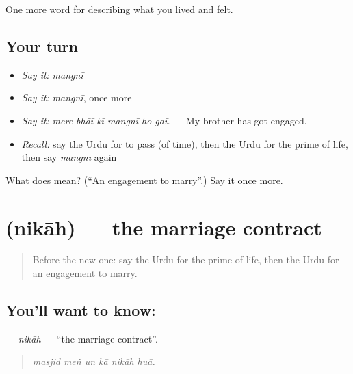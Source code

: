 \begin{grammarlens}[title={What you've built}]
One more word for describing what you lived and felt.
\end{grammarlens}

\subsection*{Your turn}
\begin{itemize}
\raggedright
  \item \emph{Say it:} \emph{mangnī}
  \item \emph{Say it:} \emph{mangnī}, once more
  \item \emph{Say it:} \emph{mere bhāī kī mangnī ho gaī.} — My brother has got engaged.
  \item \emph{Recall:} say the Urdu for to pass (of time), then the Urdu for the prime of life, then say \emph{mangnī} again
\end{itemize}

\begin{tcolorbox}[breakable,colback=teal!4,colframe=teal!35!black,title={Before you move on}]
What does  mean? (\textquotedblleft{}An engagement to marry\textquotedblright{}.) Say it once more.
\end{tcolorbox}
\section[\texorpdfstring{\ur{نکاح} (nikāh)}{نکاح (nikāh)}]{ (nikāh) — the marriage contract}

\label{lesson:UR-C487-nikah}



\begin{quote}
Before the new one: say the Urdu for the prime of life, then the Urdu for an engagement to marry.
\end{quote}

\subsection*{You'll want to know: }
\textbf{} — \emph{nikāh} — \textquotedblleft{}the marriage contract\textquotedblright{}.

\begin{quote}
     
\end{quote}

\begin{quote}
\emph{masjid meṅ un kā nikāh huā.}
\end{quote}

